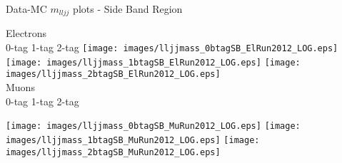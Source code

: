 
\begin{frame}{Data-MC $m_{lljj}$ plots - Side Band Region}
  \begin{center}
    Electrons\\
    0-tag \hspace{7.5em} 1-tag \hspace{7.5em} 2-tag
  \texttt{[image: images/lljjmass\_0btagSB\_ElRun2012\_LOG.eps]}
  \texttt{[image: images/lljjmass\_1btagSB\_ElRun2012\_LOG.eps]}
  \texttt{[image: images/lljjmass\_2btagSB\_ElRun2012\_LOG.eps]}\\
  Muons\\
    0-tag \hspace{7.5em} 1-tag \hspace{7.5em} 2-tag
  
  \texttt{[image: images/lljjmass\_0btagSB\_MuRun2012\_LOG.eps]}
  \texttt{[image: images/lljjmass\_1btagSB\_MuRun2012\_LOG.eps]}
  \texttt{[image: images/lljjmass\_2btagSB\_MuRun2012\_LOG.eps]}
  \end{center}
\end{frame}


